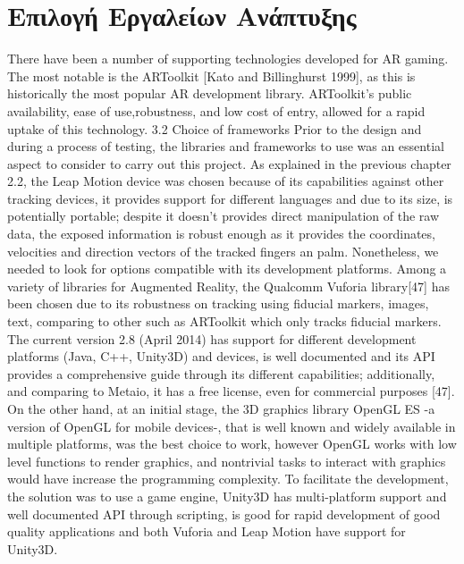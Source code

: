 
\section{Επιλογή Εργαλείων Ανάπτυξης}

There have been a number of supporting technologies developed for AR gaming. The most notable is the ARToolkit [Kato and Billinghurst 1999], as this is historically the most popular AR development library. ARToolkit’s public availability, ease of use,robustness, and low cost of entry, allowed for a rapid uptake of this technology.
3.2 Choice of frameworks Prior to the design and during a process of testing, the libraries and frameworks to use was an essential aspect to consider to carry out this project. As explained in the previous chapter 2.2, the Leap Motion device was chosen because of its capabilities against other tracking devices, it provides support for different languages and due to its size, is potentially portable; despite it doesn’t provides direct manipulation of the raw data, the exposed information is robust enough as it provides the coordinates, velocities and direction vectors of the tracked fingers an palm. Nonetheless, we needed to look for options compatible with its development platforms. Among a variety of libraries for Augmented Reality, the Qualcomm Vuforia library[47] has been chosen due to its robustness on tracking using fiducial markers, images, text, comparing to other such as ARToolkit which only tracks fiducial markers. The current version 2.8 (April 2014) has support for different development platforms (Java, C++, Unity3D) and devices, is well documented and its API provides a comprehensive guide through its different capabilities; additionally, and comparing to Metaio, it has a free license, even for commercial purposes [47]. On the other hand, at an initial stage, the 3D graphics library OpenGL ES -a version of OpenGL for mobile devices-, that is well known and widely available in multiple platforms, was the best choice to work, however OpenGL works with low level functions to render graphics, and nontrivial tasks to interact with graphics would have increase the programming complexity. To facilitate the development, the solution was to use a game engine, Unity3D has multi-platform support and well documented API through scripting, is good for rapid development of good quality applications and both Vuforia and Leap Motion have support for Unity3D.


